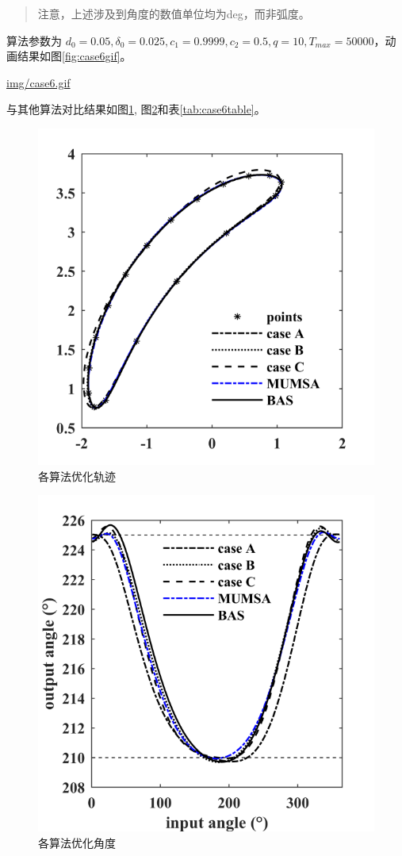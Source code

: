 \documentclass[]{ctexbook}
\begin{document}
\begin{quote}
注意，上述涉及到角度的数值单位均为deg，而非弧度。
\end{quote}

算法参数为
\(d_0 = 0.05,\delta_0=0.025,c_1=0.9999,c_2=0.5,q=10,T_{max}=50000\)，动画结果如图\ref{fig:case6gif}。

\url{img/case6.gif}

与其他算法对比结果如图\ref{fig:case6png},
图\ref{fig:case6png2}和表\ref{tab:case6table}。

\begin{figure}

{\centering \includegraphics[width=0.5\linewidth]{img/case6png} 

}

\caption{各算法优化轨迹}\label{fig:case6png}
\end{figure}

\begin{figure}

{\centering \includegraphics[width=0.5\linewidth]{img/case6png2} 

}

\caption{各算法优化角度}\label{fig:case6png2}
\end{figure}
\end{document}
